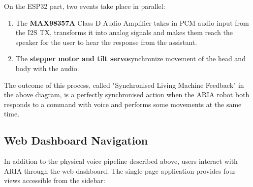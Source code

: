 On the ESP32 part, two events take place in parallel:
\begin{enumerate}
  \item The \textbf{MAX98357A} Class D Audio Amplifier takes in PCM audio input from the I2S TX, transforms it into analog signals and makes them reach the speaker for the user to hear the response from the assistant.
  \item The \textbf{stepper motor and tilt servo}synchronize movement of the head and body with the audio.
\end{enumerate}

The outcome of this process, called "Synchronised Living Machine Feedback" in the above diagram, is a perfectly synchronised action when the ARIA robot both responds to a command with voice and performs some movements at the same time.


\subsection{Web Dashboard Navigation}

In addition to the physical voice pipeline described above, users interact with ARIA through the web dashboard. The single-page application provides four views accessible from the sidebar:

